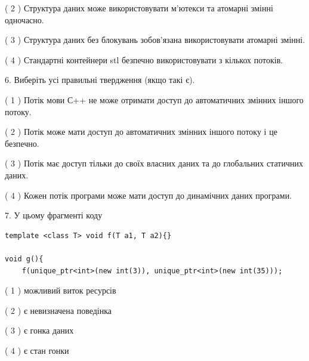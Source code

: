 \documentclass[12pt, ukrainian]{article}
\begin{document}
\begin {large}
{( 2 ) Структура даних може використовувати м’ютекси та атомарні змінні одночасно.%

( 3 ) Структура даних без блокувань зобов’язана використовувати атомарні змінні.%

( 4 ) Стандартні контейнери stl безпечно використовувати з кількох потоків.%
\newpage



\vspace{5mm}
6. Виберіть усі правильні твердження (якщо такі є).\par
\vspace{2mm}

( 1 ) Потік мови С++ не може отримати доступ до автоматичних змінних іншого потоку.%

( 2 ) Потік може мати доступ до автоматичних змінних іншого потоку і це безпечно.%

( 3 ) Потік має доступ тільки до своїх власних даних та до глобальних статичних даних.%

( 4 ) Кожен потік програми може мати доступ до динамічних даних програми.%


\vspace{5mm}
7. У цьому фрагменті коду
\begin{verbatim}
template <class T> void f(T a1, T a2){}

void g(){
    f(unique_ptr<int>(new int(3)), unique_ptr<int>(new int(35)));
\end{verbatim}

( 1 ) можливий виток ресурсів%

( 2 ) є невизначена поведінка%

( 3 ) є гонка даних%

( 4 ) є стан гонки%
}
\end {large}
\end{document}
